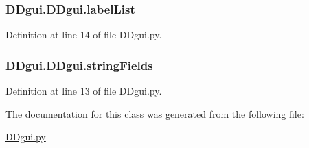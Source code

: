 \subsubsection[{label\+List}]{\setlength{\rightskip}{0pt plus 5cm}D\+Dgui.\+D\+Dgui.\+label\+List}\label{class_d_dgui_1_1_d_dgui_aebd2ffde85b31b66c5c3f8f9402bcbaf}


Definition at line 14 of file D\+Dgui.\+py.

\hypertarget{class_d_dgui_1_1_d_dgui_a1a59216313e5a1e12e2b43cfc0a478e0}{}
\subsubsection[{string\+Fields}]{\setlength{\rightskip}{0pt plus 5cm}D\+Dgui.\+D\+Dgui.\+string\+Fields}\label{class_d_dgui_1_1_d_dgui_a1a59216313e5a1e12e2b43cfc0a478e0}


Definition at line 13 of file D\+Dgui.\+py.



The documentation for this class was generated from the following file\+:\begin{DoxyCompactItemize}
\item 
\hyperlink{_d_dgui_8py}{D\+Dgui.\+py}\end{DoxyCompactItemize}
